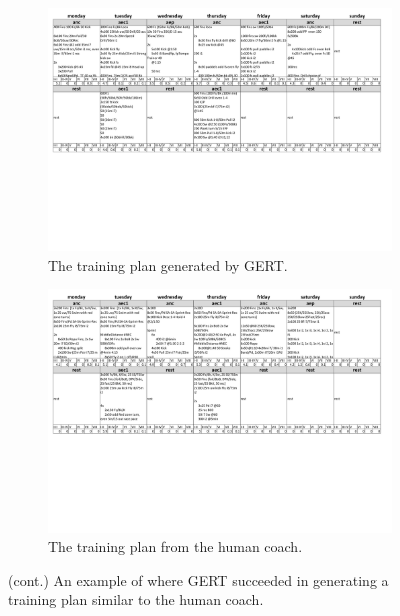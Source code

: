 \begin{figure}\ContinuedFloat
    \begin{subfigure}[t]{\textwidth}
        \centering
        \includegraphics[width=\textwidth,trim={0 8cm 0 0},clip]{chapters/figures/result_examples/good_pred.pdf}
        \captionsetup{width=.9\linewidth}
        \caption{The training plan generated by GERT.}
    \end{subfigure}
    
    \begin{subfigure}[t]{\textwidth}
        \centering
        \includegraphics[width=\textwidth,trim={0 8cm 0 0},clip]{chapters/figures/result_examples/good_true.pdf}
        \captionsetup{width=.9\linewidth}
        \caption{The training plan from the human coach.}
    \end{subfigure}
    \caption{(cont.) An example of where GERT succeeded in generating a training plan similar to the human coach.}
    \label{fig:gert_good_example}
\end{figure}

